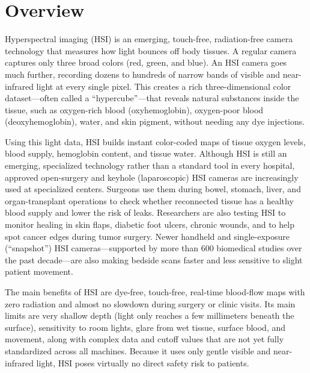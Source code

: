 \label{ch:infographic-hsi}

\section{Overview}

Hyperspectral imaging (HSI) is an emerging, touch-free, radiation-free camera technology that measures how light bounces off body tissues. A regular camera captures only three broad colors (red, green, and blue). An HSI camera goes much further, recording dozens to hundreds of narrow bands of visible and near-infrared light at every single pixel. This creates a rich three-dimensional color dataset---often called a ``hypercube''---that reveals natural substances inside the tissue, such as oxygen-rich blood (oxyhemoglobin), oxygen-poor blood (deoxyhemoglobin), water, and skin pigment, without needing any dye injections.

Using this light data, HSI builds instant color-coded maps of tissue oxygen levels, blood supply, hemoglobin content, and tissue water. Although HSI is still an emerging, specialized technology rather than a standard tool in every hospital, approved open-surgery and keyhole (laparoscopic) HSI cameras are increasingly used at specialized centers. Surgeons use them during bowel, stomach, liver, and organ-transplant operations to check whether reconnected tissue has a healthy blood supply and lower the risk of leaks. Researchers are also testing HSI to monitor healing in skin flaps, diabetic foot ulcers, chronic wounds, and to help spot cancer edges during tumor surgery. Newer handheld and single-exposure (``snapshot'') HSI cameras---supported by more than 600 biomedical studies over the past decade---are also making bedside scans faster and less sensitive to slight patient movement.

The main benefits of HSI are dye-free, touch-free, real-time blood-flow maps with zero radiation and almost no slowdown during surgery or clinic visits. Its main limits are very shallow depth (light only reaches a few millimeters beneath the surface), sensitivity to room lights, glare from wet tissue, surface blood, and movement, along with complex data and cutoff values that are not yet fully standardized across all machines. Because it uses only gentle visible and near-infrared light, HSI poses virtually no direct safety risk to patients.

